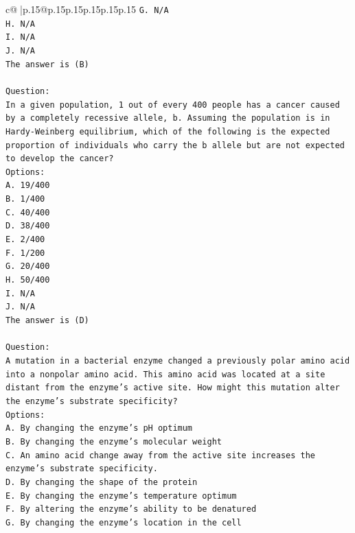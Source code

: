 \documentclass{article}
\begin{document}
{\begin{supertabular}{c@{$\;$}|p{.15\linewidth}@{}p{.15\linewidth}p{.15\linewidth}p{.15\linewidth}p{.15\linewidth}p{.15\linewidth}}
{{{\texttt{G. N/A} \\
\texttt{H. N/A} \\
\texttt{I. N/A} \\
\texttt{J. N/A} \\
\texttt{The answer is (B)} \\
\\ 
\texttt{Question:} \\
\texttt{In a given population, 1 out of every 400 people has a cancer caused by a completely recessive allele, b. Assuming the population is in Hardy{-}Weinberg equilibrium, which of the following is the expected proportion of individuals who carry the b allele but are not expected to develop the cancer?} \\
\texttt{Options:} \\
\texttt{A. 19/400} \\
\texttt{B. 1/400} \\
\texttt{C. 40/400} \\
\texttt{D. 38/400} \\
\texttt{E. 2/400} \\
\texttt{F. 1/200} \\
\texttt{G. 20/400} \\
\texttt{H. 50/400} \\
\texttt{I. N/A} \\
\texttt{J. N/A} \\
\texttt{The answer is (D)} \\
\\ 
\texttt{Question:} \\
\texttt{A mutation in a bacterial enzyme changed a previously polar amino acid into a nonpolar amino acid. This amino acid was located at a site distant from the enzyme’s active site. How might this mutation alter the enzyme’s substrate specificity?} \\
\texttt{Options:} \\
\texttt{A. By changing the enzyme’s pH optimum} \\
\texttt{B. By changing the enzyme's molecular weight} \\
\texttt{C. An amino acid change away from the active site increases the enzyme's substrate specificity.} \\
\texttt{D. By changing the shape of the protein} \\
\texttt{E. By changing the enzyme's temperature optimum} \\
\texttt{F. By altering the enzyme's ability to be denatured} \\
\texttt{G. By changing the enzyme’s location in the cell} \\
}}}
\end{supertabular}}
\end{document}
